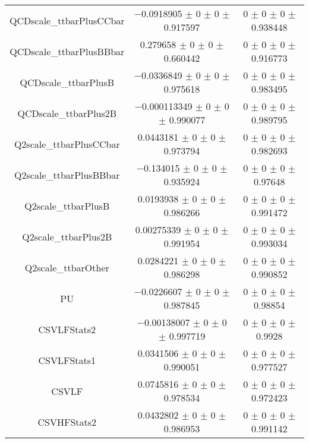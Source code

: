 \begin{table}
\begin{tabular}{ccc}
QCDscale\_ttbarPlusCCbar 	& \num{-0.0918905} $\pm$ \num{0} $\pm$ \num{0} $\pm$ \num{0.917597} 	& \num{0} $\pm$ \num{0} $\pm$ \num{0} $\pm$ \num{0.938448}\\
QCDscale\_ttbarPlusBBbar 	& \num{0.279658} $\pm$ \num{0} $\pm$ \num{0} $\pm$ \num{0.660442} 	& \num{0} $\pm$ \num{0} $\pm$ \num{0} $\pm$ \num{0.916773}\\
QCDscale\_ttbarPlusB 	& \num{-0.0336849} $\pm$ \num{0} $\pm$ \num{0} $\pm$ \num{0.975618} 	& \num{0} $\pm$ \num{0} $\pm$ \num{0} $\pm$ \num{0.983495}\\
QCDscale\_ttbarPlus2B 	& \num{-0.000113349} $\pm$ \num{0} $\pm$ \num{0} $\pm$ \num{0.990077} 	& \num{0} $\pm$ \num{0} $\pm$ \num{0} $\pm$ \num{0.989795}\\
Q2scale\_ttbarPlusCCbar 	& \num{0.0443181} $\pm$ \num{0} $\pm$ \num{0} $\pm$ \num{0.973794} 	& \num{0} $\pm$ \num{0} $\pm$ \num{0} $\pm$ \num{0.982693}\\
Q2scale\_ttbarPlusBBbar 	& \num{-0.134015} $\pm$ \num{0} $\pm$ \num{0} $\pm$ \num{0.935924} 	& \num{0} $\pm$ \num{0} $\pm$ \num{0} $\pm$ \num{0.97648}\\
Q2scale\_ttbarPlusB 	& \num{0.0193938} $\pm$ \num{0} $\pm$ \num{0} $\pm$ \num{0.986266} 	& \num{0} $\pm$ \num{0} $\pm$ \num{0} $\pm$ \num{0.991472}\\
Q2scale\_ttbarPlus2B 	& \num{0.00275339} $\pm$ \num{0} $\pm$ \num{0} $\pm$ \num{0.991954} 	& \num{0} $\pm$ \num{0} $\pm$ \num{0} $\pm$ \num{0.993034}\\
Q2scale\_ttbarOther 	& \num{0.0284221} $\pm$ \num{0} $\pm$ \num{0} $\pm$ \num{0.986298} 	& \num{0} $\pm$ \num{0} $\pm$ \num{0} $\pm$ \num{0.990852}\\
PU 	& \num{-0.0226607} $\pm$ \num{0} $\pm$ \num{0} $\pm$ \num{0.987845} 	& \num{0} $\pm$ \num{0} $\pm$ \num{0} $\pm$ \num{0.98854}\\
CSVLFStats2 	& \num{-0.00138007} $\pm$ \num{0} $\pm$ \num{0} $\pm$ \num{0.997719} 	& \num{0} $\pm$ \num{0} $\pm$ \num{0} $\pm$ \num{0.9928}\\
CSVLFStats1 	& \num{0.0341506} $\pm$ \num{0} $\pm$ \num{0} $\pm$ \num{0.990051} 	& \num{0} $\pm$ \num{0} $\pm$ \num{0} $\pm$ \num{0.977527}\\
CSVLF 	& \num{0.0745816} $\pm$ \num{0} $\pm$ \num{0} $\pm$ \num{0.978534} 	& \num{0} $\pm$ \num{0} $\pm$ \num{0} $\pm$ \num{0.972423}\\
CSVHFStats2 	& \num{0.0432802} $\pm$ \num{0} $\pm$ \num{0} $\pm$ \num{0.986953} 	& \num{0} $\pm$ \num{0} $\pm$ \num{0} $\pm$ \num{0.991142}\\

\end{tabular}
\end{table}
